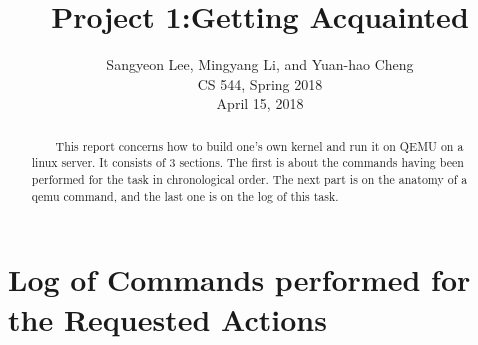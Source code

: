\documentclass[journal,onecolumn]{IEEEtran}
\begin{document}
\title{Project 1:Getting Acquainted}

\author{Sangyeon Lee,
        Mingyang Li,
        and Yuan-hao Cheng\\
        CS 544,
        Spring 2018\\
        April 15, 2018}%

\maketitle

\begin{abstract}
~~~~This report concerns how to build one’s own kernel and run it on QEMU on a linux server. It consists of 3 sections. The first is about the commands having been performed for the task in chronological order. The next part is on the anatomy of a qemu command, and the last one is on the log of this task.
\end{abstract}



\newpage


\IEEEpeerreviewmaketitle



\section{Log of Commands performed for the Requested Actions}
\end{document}
